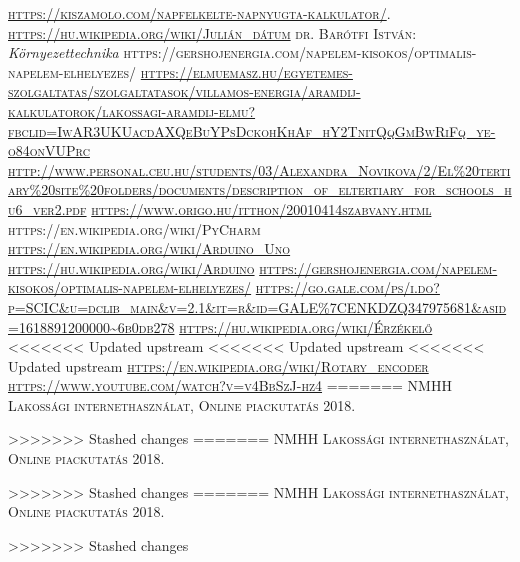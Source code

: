 \documentclass[
]{thesis-ekf}
\theoremstyle{definition}
\theoremstyle{remark}
\begin{document}
\begin{thebibliography}{2}
\textsc{\url{https://kiszamolo.com/napfelkelte-napnyugta-kalkulator/}}.
\textsc{\url{https://hu.wikipedia.org/wiki/Julián_dátum}}
\textsc{dr. Barótfi István}:  \emph{Környezettechnika}
\textsc{https://gershojenergia.com/napelem-kisokos/optimalis-napelem-elhelyezes/}
\textsc{\url{https://elmuemasz.hu/egyetemes-szolgaltatas/szolgaltatasok/villamos-energia/aramdij-kalkulatorok/lakossagi-aramdij-elmu?fbclid=IwAR3UKUacdAXQeBuYPsDckohKhAf_hY2TnitQqGmBwRiFq_ye-o84onVUPrc}}
\textsc{\url{http://www.personal.ceu.hu/students/03/Alexandra_Novikova/2/El\%20tertiary\%20site\%20folders/documents/description_of_eltertiary_for_schools_hu6_ver2.pdf}}
\textsc{\url{https://www.origo.hu/itthon/20010414szabvany.html}}
\textsc{https://en.wikipedia.org/wiki/PyCharm}
\textsc{\url{https://en.wikipedia.org/wiki/Arduino_Uno}}
\textsc{\url{https://hu.wikipedia.org/wiki/Arduino}}
\textsc{\url{https://gershojenergia.com/napelem-kisokos/optimalis-napelem-elhelyezes/}}
\textsc{\url{https://go.gale.com/ps/i.do?p=SCIC&u=dclib_main&v=2.1&it=r&id=GALE\%7CENKDZQ347975681&asid=1618891200000~6b0db278}}
\textsc{\url{https://hu.wikipedia.org/wiki/Érzékelő}}
<<<<<<< Updated upstream
<<<<<<< Updated upstream
<<<<<<< Updated upstream
\textsc{\url{https://en.wikipedia.org/wiki/Rotary_encoder}}
\textsc{\url{https://www.youtube.com/watch?v=v4BbSzJ-hz4}}
=======
\textsc{NMHH Lakossági internethasználat, Online piackutatás 2018.}

>>>>>>> Stashed changes
=======
\textsc{NMHH Lakossági internethasználat, Online piackutatás 2018.}

>>>>>>> Stashed changes
=======
\textsc{NMHH Lakossági internethasználat, Online piackutatás 2018.}

>>>>>>> Stashed changes
\end{thebibliography}
\end{document}
